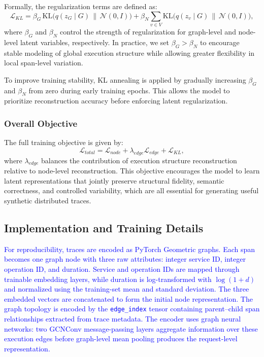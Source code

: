 \documentclass[sigconf,review]{acmart}
\begin{document}
Formally, the regularization terms are defined as:
\begin{equation}
\mathcal{L}_{KL} =
\beta_G \, \mathrm{KL}\big(q(z_G \mid G) \,\|\, \mathcal{N}(0, I)\big)
+
\beta_N \sum_{v \in V}
\mathrm{KL}\big(q(z_v \mid G) \,\|\, \mathcal{N}(0, I)\big),
\end{equation}
where $\beta_G$ and $\beta_N$ control the strength of regularization for graph-level and node-level latent variables, respectively. In practice, we set $\beta_G > \beta_N$ to encourage stable modeling of global execution structure while allowing greater flexibility in local span-level variation.

To improve training stability, KL annealing is applied by gradually increasing $\beta_G$ and $\beta_N$ from zero during early training epochs. This allows the model to prioritize reconstruction accuracy before enforcing latent regularization.

\subsubsection{Overall Objective}

The full training objective is given by:
\begin{equation}
\mathcal{L}_{total} =
\mathcal{L}_{node}
+ \lambda_{edge} \mathcal{L}_{edge}
+ \mathcal{L}_{KL},
\end{equation}
where $\lambda_{edge}$ balances the contribution of execution structure reconstruction relative to node-level reconstruction. This objective encourages the model to learn latent representations that jointly preserve structural fidelity, semantic correctness, and controlled variability, which are all essential for generating useful synthetic distributed traces.


\subsection{Implementation and Training Details}
\label{sec:training-details}

\textcolor{blue}{For reproducibility, traces are encoded as PyTorch Geometric graphs. Each span becomes one graph node with three raw attributes: integer service ID, integer operation ID, and duration. Service and operation IDs are mapped through trainable embedding layers, while duration is log-transformed with $\log(1+d)$ and normalized using the training-set mean and standard deviation. The three embedded vectors are concatenated to form the initial node representation. The graph topology is encoded by the \texttt{edge\_index} tensor containing parent--child span relationships extracted from trace metadata. The encoder uses graph neural networks: two GCNConv message-passing layers aggregate information over these execution edges before graph-level mean pooling produces the request-level representation.}
\end{document}
